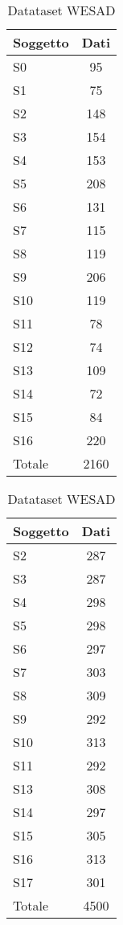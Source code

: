 \begin{table}[h]
	
\end{table}
\begin{table}[h]
    \parbox{.45\linewidth}{
    	\begin{center}
    		\begin{tabular}{l|c}
    		     \textbf{Soggetto} & \textbf{Dati}\\
    		     \hline
    		     S0 & 95 \\
    		     S1 & 75 \\
    		     S2 & 148 \\
    		     S3 & 154 \\
    		     S4 & 153 \\
    		     S5 & 208 \\
    		     S6 & 131 \\
    		     S7 & 115 \\
    		     S8 & 119 \\
    		     S9 & 206 \\
    		     S10 & 119 \\
    		     S11 & 78 \\
    		     S12 & 74 \\
    		     S13 & 109 \\
    		     S14 & 72 \\
    		     S15 & 84 \\
    		     S16 & 220 \\
    		     \hline
    		     Totale & 2160
    		\end{tabular}
    		\caption{Datataset ASCERTAIN}
    		\label{tab:splittedascertain}
    	\end{center}
    }
    \parbox{.45\linewidth}{
    	\begin{center}
    		\begin{tabular}{l|c}
    		     \textbf{Soggetto} & \textbf{Dati}\\
    		     \hline
    		     S2 & 287 \\
    		     S3 & 287 \\
    		     S4 & 298 \\
    		     S5 & 298 \\
    		     S6 & 297 \\
    		     S7 & 303 \\
    		     S8 & 309 \\
    		     S9 & 292 \\
    		     S10 & 313 \\
    		     S11 & 292 \\
    		     S13 & 308 \\
    		     S14 & 297 \\
    		     S15 & 305 \\
    		     S16 & 313 \\
    		     S17 & 301 \\
    		     \hline
    		     Totale & 4500
    		\end{tabular}
    		\caption{Datataset WESAD}
    		\label{tab:splittedwesad}
    	\end{center}
	}
\end{table}
